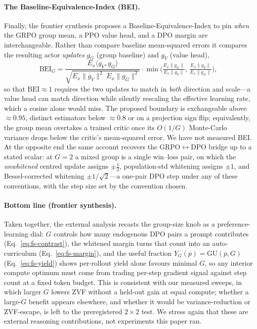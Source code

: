 \paragraph{The Baseline-Equivalence-Index (BEI).}
Finally, the frontier synthesis proposes a Baseline-Equivalence-Index
to pin \emph{when} the GRPO group mean, a PPO value head, and a DPO
margin are interchangeable. Rather than compare baseline mean-squared
errors it compares the resulting actor \emph{updates} $g_G$ (group
baseline) and $g_V$ (value head),
\begin{equation}
  \mathrm{BEI}_G =
  \frac{E_x\langle g_V, g_G\rangle}
       {\sqrt{E_x\|g_V\|^2\; E_x\|g_G\|^2}}
  \cdot
  \min\!\Big(\tfrac{E_x\|g_G\|}{E_x\|g_V\|},\,\tfrac{E_x\|g_V\|}{E_x\|g_G\|}\Big),
  \label{eq:fs-bei}
\end{equation}
so that $\mathrm{BEI}\approx 1$ requires the two updates to match in
\emph{both} direction and scale---a value head can match direction
while silently rescaling the effective learning rate, which a cosine
alone would miss. The proposed boundary is exchangeable above
$\approx 0.95$, distinct estimators below $\approx 0.8$ or on a
projection sign flip; equivalently, the group mean overtakes a trained
critic once its $O(1/G)$ Monte-Carlo variance drops below the critic's
mean-squared error. We have not measured BEI. At the opposite end the same account
recovers the GRPO$\leftrightarrow$DPO bridge up to a stated scalar:
at $G{=}2$ a mixed group is a single win--loss pair, on which the
\emph{unwhitened} centred update assigns $\pm\tfrac12$,
population-std whitening assigns $\pm1$, and Bessel-corrected
whitening $\pm1/\sqrt2$---a one-pair DPO step under any of these
conventions, with the step size set by the convention chosen.

\paragraph{Bottom line (frontier synthesis).}
Taken together, the external analysis recasts the group-size knob as a
preference-learning dial: $G$ controls how many endogenous DPO pairs a
prompt contributes (Eq.~\ref{eq:fs-contrast}), the whitened margin turns
that count into an auto-curriculum (Eq.~\ref{eq:fs-margin}), and the
useful fraction $Y_G(p)=\mathrm{GU}(p,G)$ (Eq.~\ref{eq:fs-yield})
shows per-rollout yield alone favours minimal $G$, so any interior
compute optimum must come from trading per-step gradient signal against step
count at a fixed token budget. This is consistent
with our measured sweeps, in which larger $G$ lowers ZVF without a held-out
gain at equal compute; whether a large-$G$ benefit appears elsewhere, and whether
it would be variance-reduction or ZVF-escape, is left to the preregistered
$2{\times}2$ test. We stress again that these are external reasoning contributions,
not experiments this paper ran.
